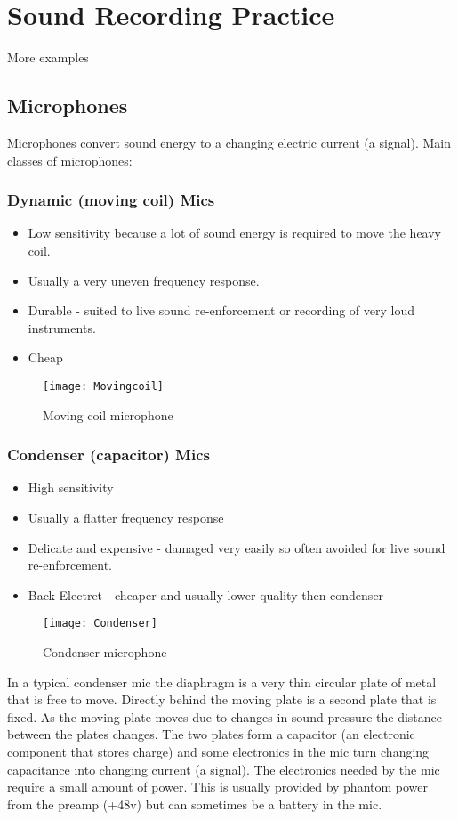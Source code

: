 
\chapter{Sound Recording Practice}
\label{examples}

More examples
\section{Microphones}
Microphones convert sound energy to a changing electric current (a signal).
Main classes of microphones:
\subsection{Dynamic (moving coil) Mics}
\begin{itemize}
\item Low sensitivity because a lot of sound energy is required to move the heavy coil.
\item Usually a very uneven frequency response.
\item Durable - suited to live sound re-enforcement or recording of very loud instruments.
\item Cheap
\end{itemize}

\begin{figure}[H]
\centering
\texttt{[image: Movingcoil]}\caption{Moving coil microphone}
\label{fig:movingcoil}
\end{figure}

\subsection{Condenser (capacitor) Mics}
\begin{itemize}
\item High sensitivity
\item Usually a flatter frequency response
\item Delicate and expensive - damaged very easily so often avoided for live sound re-enforcement.
\item Back Electret - cheaper and usually lower quality then condenser
\end{itemize}


\begin{figure}[H]
\centering
\texttt{[image: Condenser]}\caption{Condenser microphone}
\label{fig:condenser}
\end{figure}

In a typical condenser mic the diaphragm is a very thin circular plate of metal that is free to move. Directly behind the moving plate is a second plate that is fixed. As the moving plate moves due to changes in sound pressure the distance between the plates changes. The two plates form a capacitor (an electronic component that stores charge) and some electronics in the mic turn changing capacitance into changing current (a signal). The electronics needed by the mic require a small amount of power. This is usually provided by phantom power from the preamp (+48v) but can sometimes be a battery in the mic.

